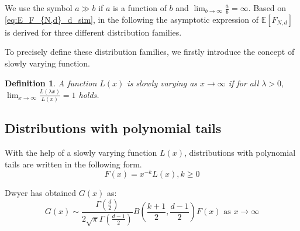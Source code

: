 \documentclass[conference,a4paper]{IEEEtran}
\def\E{\mathbb{E}}
\newtheorem{definition}{Definition}
\begin{document}
We use the symbol $a \gg b$ if $a$ is a function of $b$ and $\lim_{b\to \infty} \frac{a}{b} = \infty$.
Based on \eqref{eq:E_F_{N,d}_d_sim}, in the following
the asymptotic expression of $\E[F_{N,d}]$ is derived
for three different distribution families.

To precisely define these distribution families, we firstly introduce the concept of slowly varying function.
\begin{definition}
A function $L(x)$ is
slowly varying as $x\to \infty$
if for all $\lambda>0$,
$\lim_{x\to\infty}\frac{L(\lambda x)}{L(x)}=1$
holds.
\end{definition}

\subsection{Distributions with polynomial tails}

With the help of a slowly varying function $L(x)$,
distributions with polynomial tails are written
in the following form.
\begin{equation}\label{eq:F_poly_tail}
     F(x) = x^{-k} L(x), k\geq 0
\end{equation}

Dwyer\cite{dwyer1991convex} has obtained $G(x)$ as:
\begin{equation}\label{eq:g_poly_tail}
     G(x) \sim \frac{\Gamma(\frac{d}{2})}{2\sqrt{\pi} \Gamma(\frac{d-1}{2})}
     B\left(\frac{k+1}{2}, \frac{d-1}{2}\right) F(x)  \textrm{ as } x\to \infty
\end{equation}
\end{document}
